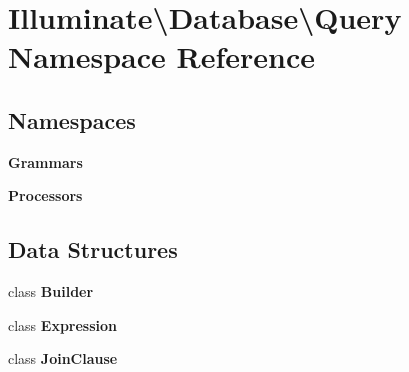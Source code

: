 \section{Illuminate\textbackslash{}Database\textbackslash{}Query Namespace Reference}
\label{namespace_illuminate_1_1_database_1_1_query}
\subsection*{Namespaces}
\begin{DoxyCompactItemize}
\item 
 {\bf Grammars}
\item 
 {\bf Processors}
\end{DoxyCompactItemize}
\subsection*{Data Structures}
\begin{DoxyCompactItemize}
\item 
class {\bf Builder}
\item 
class {\bf Expression}
\item 
class {\bf Join\+Clause}
\end{DoxyCompactItemize}
